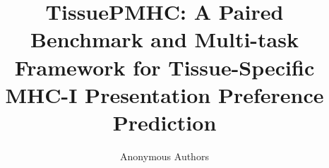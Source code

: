 \documentclass{article}
\title{TissuePMHC: A Paired Benchmark and Multi-task Framework for Tissue-Specific MHC-I Presentation Preference Prediction}
\author{Anonymous Authors}
\date{}
\begin{document}
\maketitle













\clearpage
\appendix
\renewcommand{\thefigure}{A\arabic{figure}}
\setcounter{figure}{0}
\renewcommand{\thetable}{A\arabic{table}}
\setcounter{table}{0}


\clearpage

\end{document}
